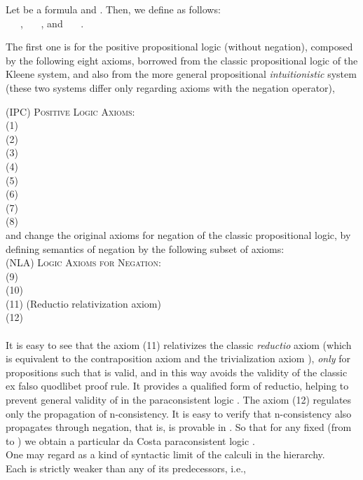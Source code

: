 \documentclass{llncs}
\begin{document}
\begin{definition}\label{defn:daCosta(n)} Let  be a formula and .
Then, we define  as
follows:\\
\noindent \ \ \ ,
\noindent \ \ \ , and \noindent \ \ \
.
\end{definition}
The first one is for the positive propositional logic (without
negation), composed by the following eight axioms, borrowed from the
 classic propositional logic of the
Kleene  system, and also from the more general propositional
\emph{intuitionistic} system (these two systems differ only
regarding axioms with the negation operator),

\textsc{(IPC) Positive  Logic Axioms:}\\
 (1) \\
 (2)  \\
 (3)  \\
 (4)  \\
 (5)  \\
 (6)  \\
 (7)  \\
 (8)  \\
 and change the original axioms for negation of the classic
 propositional logic, by defining semantics of negation by the
 following subset of axioms:\\
\textsc{(NLA)  Logic Axioms for Negation:}\\
(9) \\
(10) \\
  (11) 
(Reductio relativization axiom)\\
 (12) 
 \\ \\
 It is easy to see that the axiom (11) relativizes the classic \emph{reductio} axiom  (which is equivalent to the contraposition axiom  and the trivialization
 axiom ), \emph{only} for propositions  such
 that  is valid, and in this way avoids the validity of the
 classic ex falso quodlibet proof rule.  It provides a qualified form of reductio, helping to prevent general validity  of 
 in the paraconsistent logic . The axiom (12) regulates
 only the propagation of n-consistency. It is easy to verify that
 n-consistency also propagates through negation, that is,  is provable in . So that for any fixed  (from  to ) we
 obtain a particular da Costa paraconsistent logic . \\
 One may regard  as a kind of syntactic limit \cite{CaMa99} of the
 calculi in the hierarchy.\\
 Each  is strictly weaker than any of its predecessors, i.e.,
\end{document}
